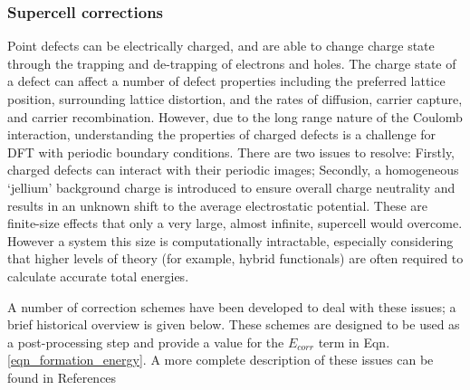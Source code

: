 \subsubsection{Supercell corrections} \label{corrections}
Point defects can be electrically charged, and are able to change charge state through the trapping and de-trapping of electrons and holes. 
The charge state of a defect can affect a number of defect properties including the preferred lattice position, surrounding lattice distortion, and the rates of diffusion, carrier capture, and carrier recombination.
However, due to the long range nature of the Coulomb interaction, understanding the properties of charged defects is a challenge for DFT with periodic boundary conditions.
There are two issues to resolve: 
Firstly, charged defects can interact with their periodic images; 
Secondly, a homogeneous `jellium' background charge is introduced to ensure overall charge neutrality and results in an unknown shift to the average electrostatic potential. 
These are finite-size effects that only a very large, almost infinite, supercell would overcome.
However a system this size is computationally intractable, especially considering that higher levels of theory (for example, hybrid functionals) are often required to calculate accurate total energies.

A number of correction schemes have been developed to deal with these issues; a brief historical overview is given below. These schemes are designed to be used as a post-processing step and provide a value for the $E_{corr}$ term in Eqn.\ref{eqn_formation_energy}. A more complete description of these issues can be found in References \cite{durrant2018,Vinichenko2017}

